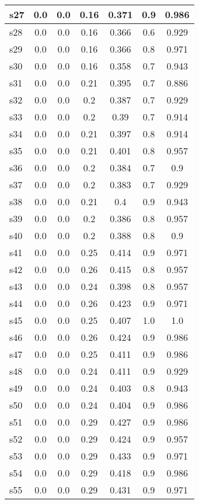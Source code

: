 \documentclass{article}
\begin{document}
\begin{tabular}{|l|c|c|c|c|c|c|}
\hline
s27 &0.0 & 0.0 & 0.16 & 0.371 & 0.9 & 0.986\\
\hline
s28 &0.0 & 0.0 & 0.16 & 0.366 & 0.6 & 0.929\\
\hline
s29 &0.0 & 0.0 & 0.16 & 0.366 & 0.8 & 0.971\\
\hline
s30 &0.0 & 0.0 & 0.16 & 0.358 & 0.7 & 0.943\\
\hline
s31 &0.0 & 0.0 & 0.21 & 0.395 & 0.7 & 0.886\\
\hline
s32 &0.0 & 0.0 & 0.2 & 0.387 & 0.7 & 0.929\\
\hline
s33 &0.0 & 0.0 & 0.2 & 0.39 & 0.7 & 0.914\\
\hline
s34 &0.0 & 0.0 & 0.21 & 0.397 & 0.8 & 0.914\\
\hline
s35 &0.0 & 0.0 & 0.21 & 0.401 & 0.8 & 0.957\\
\hline
s36 &0.0 & 0.0 & 0.2 & 0.384 & 0.7 & 0.9\\
\hline
s37 &0.0 & 0.0 & 0.2 & 0.383 & 0.7 & 0.929\\
\hline
s38 &0.0 & 0.0 & 0.21 & 0.4 & 0.9 & 0.943\\
\hline
s39 &0.0 & 0.0 & 0.2 & 0.386 & 0.8 & 0.957\\
\hline
s40 &0.0 & 0.0 & 0.2 & 0.388 & 0.8 & 0.9\\
\hline
s41 &0.0 & 0.0 & 0.25 & 0.414 & 0.9 & 0.971\\
\hline
s42 &0.0 & 0.0 & 0.26 & 0.415 & 0.8 & 0.957\\
\hline
s43 &0.0 & 0.0 & 0.24 & 0.398 & 0.8 & 0.957\\
\hline
s44 &0.0 & 0.0 & 0.26 & 0.423 & 0.9 & 0.971\\
\hline
s45 &0.0 & 0.0 & 0.25 & 0.407 & 1.0 & 1.0\\
\hline
s46 &0.0 & 0.0 & 0.26 & 0.424 & 0.9 & 0.986\\
\hline
s47 &0.0 & 0.0 & 0.25 & 0.411 & 0.9 & 0.986\\
\hline
s48 &0.0 & 0.0 & 0.24 & 0.411 & 0.9 & 0.929\\
\hline
s49 &0.0 & 0.0 & 0.24 & 0.403 & 0.8 & 0.943\\
\hline
s50 &0.0 & 0.0 & 0.24 & 0.404 & 0.9 & 0.986\\
\hline
s51 &0.0 & 0.0 & 0.29 & 0.427 & 0.9 & 0.986\\
\hline
s52 &0.0 & 0.0 & 0.29 & 0.424 & 0.9 & 0.957\\
\hline
s53 &0.0 & 0.0 & 0.29 & 0.433 & 0.9 & 0.971\\
\hline
s54 &0.0 & 0.0 & 0.29 & 0.418 & 0.9 & 0.986\\
\hline
s55 &0.0 & 0.0 & 0.29 & 0.431 & 0.9 & 0.971\\

\end{tabular}
\end{document}
